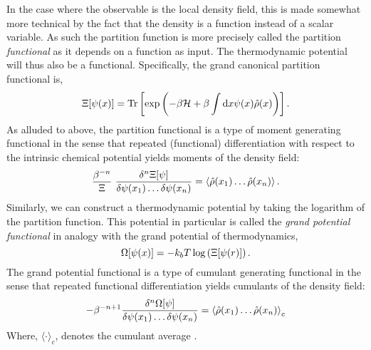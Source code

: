 In the case where the observable is the local density field, this is made somewhat
more technical by the fact that the density is a function instead of a scalar
variable.  As such the partition function is more precisely called the
partition \textit{functional} as it depends on a function as input. The
thermodynamic potential will thus also be a functional.  Specifically, the grand
canonical partition functional is,
%
\begin{equation}
    \Xi[\psi(x)] = \mathrm{Tr}\left[ \exp\left(-\beta\mathcal{H} +\beta\int\mathrm{d}x
        \psi(x) \hat{\rho}(x)\right) \right].
\end{equation}
%
As alluded to above, the partition functional is a type of moment generating
functional in the sense that repeated (functional) differentiation with respect 
to the intrinsic  chemical potential yields moments of the density field:
%
\begin{equation}
    \frac{\beta^{-n}}{\Xi}\,\, \frac{\delta^n \Xi[\psi]}{\delta \psi(x_1) \dots \delta\psi(x_n)} 
        = \left\langle \hat{\rho}(x_1)\dots\hat{\rho}(x_n) \right\rangle.
\end{equation}
%
Similarly, we can construct a thermodynamic potential by taking the logarithm
of the partition function. This potential in particular is called the
\textit{grand potential functional} in analogy with the grand potential of
thermodynamics,
%
\begin{equation}
    \Omega[\psi(x)] = -k_bT\log\left(\Xi[\psi(r)]\right).
\end{equation}
%
The grand potential functional is a type of cumulant generating functional in
the sense that repeated functional differentiation yields cumulants of the
density field:
%
\begin{equation}
    -\beta^{-n + 1} \frac{\delta^n\Omega[\psi]}{\delta\psi(x_1)\dots\delta\psi(x_n)}
        = \left\langle \hat{\rho}(x_1)\dots\hat{\rho}(x_n) \right\rangle_c
\end{equation}
%
Where, $\langle \cdot \rangle_c$, denotes the cumulant average \cite{KUBO62}.

